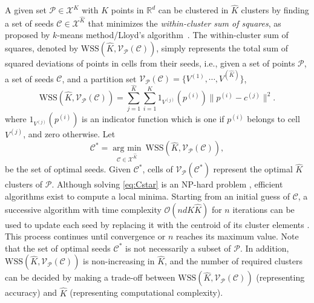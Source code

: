 \documentclass[11pt,letterpaper]{article}
\newcommand{\R}{\mathbb{R}}
\newcommand{\mcP}{\mathcal{P}}
\newcommand{\mcV}{\mathcal{V}}
\newcommand{\mcC}{\mathcal{C}}
\begin{document}
    A given set $\mcP\in \mathcal{X}^K$ with $K$ points in $\R^d$ can be clustered in $\hat{K}$ clusters by finding a set of seeds $\mcC\in \mathcal{X}^{\hat{K}}$ that minimizes the \emph{within-cluster sum of squares}, as proposed by $k$-means method/Lloyd's algorithm~\cite{hartigan1975clustering}. The within-cluster sum of squares, denoted by $\mathrm{WSS}(\hat{K},\mcV_{\mcP}(\mcC))$, simply represents the total sum of squared deviations of points in cells from their seeds, i.e., given a set of points $\mcP$, a set of seeds $\mcC$, and a partition set $\mcV_{\mcP}(\mcC)=\{V^{(1)},\cdots,V^{(\hat{K})}\}$,
\begin{equation} \label{eq:wss}
    \mathrm{WSS}(\hat{K},\mcV_{\mcP}(\mcC))=\sum_{j=1}^{\hat{K}}\sum_{i=1}^{K}  1_{V^{(j)}}(p^{(i)})\|p^{(i)}-c^{(j)}\|^2.
\end{equation}
where $1_{V^{(j)}}(p^{(i)})$ is an indicator function which is one if $p^{(i)}$ belongs to cell $V^{(j)}$, and zero otherwise. Let 
\begin{equation} \label{eq:Cstar}
    \mcC^\ast=\underset{\mcC\in \mathcal{X}^{\hat{K}}}{\operatorname{arg\ min}}\ \mathrm{WSS}(\hat{K},\mcV_{\mcP}(\mcC)),
\end{equation}
be the set of optimal seeds. Given $\mcC^\ast$, cells of $\mcV_{\mcP}(\mcC^\ast)$ represent the optimal $\hat{K}$ clusters of $\mcP$. Although solving \eqref{eq:Cstar} is an NP-hard problem \cite{Aloise2009}, efficient algorithms exist to compute a local minima. Starting from an initial guess of $\mcC$, a successive algorithm with time complexity $\mathcal{O}(ndK\hat{K})$ for $n$ iterations can be used to update each seed by replacing it with the centroid of its cluster elements \cite{hartigan1979algorithm}. This process continues until convergence or $n$ reaches its maximum value. Note that the set of optimal seeds $\mcC^\ast$ is not necessarily a subset of $\mcP$. In addition, $\mathrm{WSS}(\hat{K},\mcV_{\mcP}(\mcC))$ is non-increasing in $\hat{K}$, and the number of required clusters can be decided by making a trade-off between $\mathrm{WSS}(\hat{K},\mcV_{\mcP}(\mcC))$ (representing accuracy) and $\hat{K}$ (representing computational complexity).       
	
\end{document}
